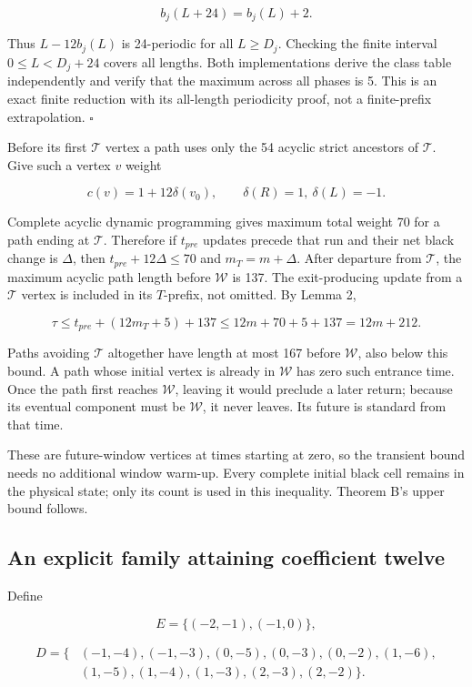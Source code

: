 \documentclass[
  11pt,
]{article}
\begin{document}
\[b_j(L+24)=b_j(L)+2.\]

Thus \(L-12b_j(L)\) is 24-periodic for all \(L\ge D_j\). Checking the
finite interval \(0\le L<D_j+24\) covers all lengths. Both
implementations derive the class table independently and verify that the
maximum across all phases is 5. This is an exact finite reduction with
its all-length periodicity proof, not a finite-prefix extrapolation.
\(\square\)

Before its first \(\mathcal T\) vertex a path uses only the 54 acyclic
strict ancestors of \(\mathcal T\). Give such a vertex \(v\) weight

\[c(v)=1+12\delta(v_0),\qquad \delta(R)=1,\ \delta(L)=-1.\]

Complete acyclic dynamic programming gives maximum total weight 70 for a
path ending at \(\mathcal T\). Therefore if \(t_{pre}\) updates precede
that run and their net black change is \(\Delta\), then
\(t_{pre}+12\Delta\le70\) and \(m_T=m+\Delta\). After departure from
\(\mathcal T\), the maximum acyclic path length before \(\mathcal W\) is
137. The exit-producing update from a \(\mathcal T\) vertex is included
in its \(T\)-prefix, not omitted. By Lemma 2,

\[\tau\le t_{pre}+(12m_T+5)+137\le12m+70+5+137=12m+212.\]

Paths avoiding \(\mathcal T\) altogether have length at most 167 before
\(\mathcal W\), also below this bound. A path whose initial vertex is
already in \(\mathcal W\) has zero such entrance time. Once the path
first reaches \(\mathcal W\), leaving it would preclude a later return;
because its eventual component must be \(\mathcal W\), it never leaves.
Its future is standard from that time.

These are future-window vertices at times starting at zero, so the transient bound needs no additional
window warm-up. Every
complete initial black cell remains in the physical state; only its
count is used in this inequality. Theorem B's upper bound follows.

\subsection{An explicit family attaining coefficient
twelve}\label{ten-6}

Define

\[E=\{(-2,-1),(-1,0)\},\]

\[\begin{split}D=\{&(-1,-4),(-1,-3),(0,-5),(0,-3),(0,-2),(1,-6),\\
 &(1,-5),(1,-4),(1,-3),(2,-3),(2,-2)\}.\end{split}\]
\end{document}

